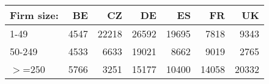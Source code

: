 \begin{tabular}{lrrrrrr}
\toprule
Firm size: & BE   & CZ    & DE    & ES    & FR    & UK    \\
\midrule
1-49       & 4547 & 22218 & 26592 & 19695 & 7818  & 9343  \\
50-249     & 4533 & 6633  & 19021 & 8662  & 9019  & 2765  \\
$>$=250    & 5766 & 3251  & 15177 & 10400 & 14058 & 20332 \\
\bottomrule
\end{tabular}

